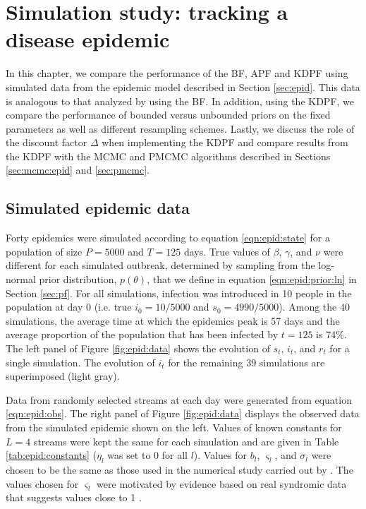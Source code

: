 \chapter{Simulation study: tracking a disease epidemic \label{ch:epid}}

In this chapter, we compare the performance of the BF, APF and KDPF using simulated data from the epidemic model described in Section \ref{sec:epid}. This data is analogous to that analyzed by \citet{skvortsov2012monitoring} using the BF. In addition, using the KDPF, we compare the performance of bounded versus unbounded priors on the fixed parameters as well as different resampling schemes. Lastly, we discuss the role of the discount factor $\Delta$ when implementing the KDPF and compare results from the KDPF with the MCMC and PMCMC algorithms described in Sections \ref{sec:mcmc:epid} and \ref{sec:pmcmc}.

\section{Simulated epidemic data}

Forty epidemics were simulated according to equation \eqref{eqn:epid:state} for a population of size $P = 5000$ and $T = 125$ days. True values of $\beta$, $\gamma$, and $\nu$ were different for each simulated outbreak, determined by sampling from the log-normal prior distribution, $p(\theta)$, that we define in equation \eqref{eqn:epid:prior:ln} in Section \ref{sec:pf}. For all simulations, infection was introduced in 10 people in the population at day 0 (i.e. true $i_0 = 10/5000$ and $s_0 = 4990/5000$). Among the 40 simulations, the average time at which the epidemics peak is 57 days and the average proportion of the population that has been infected by $t = 125$ is 74\%. The left panel of Figure \ref{fig:epid:data} shows the evolution of $s_t$, $i_t$, and $r_t$ for a single simulation. The evolution of $i_t$ for the remaining 39 simulations are superimposed (light gray).

Data from randomly selected streams at each day were generated from equation \eqref{eqn:epid:obs}. The right panel of Figure \ref{fig:epid:data} displays the observed data from the simulated epidemic shown on the left. Values of known constants for $L = 4$ streams were kept the same for each simulation and are given in Table \ref{tab:epid:constants} ($\eta_l$ was set to 0 for all $l$). Values for $b_l$, $\varsigma_l$, and $\sigma_l$ were chosen to be the same as those used in the numerical study carried out by \citet{skvortsov2012monitoring}. The values chosen for $\varsigma_l$ were motivated by evidence based on real syndromic data that suggests values close to 1 \citep{chew2010twitter}.


